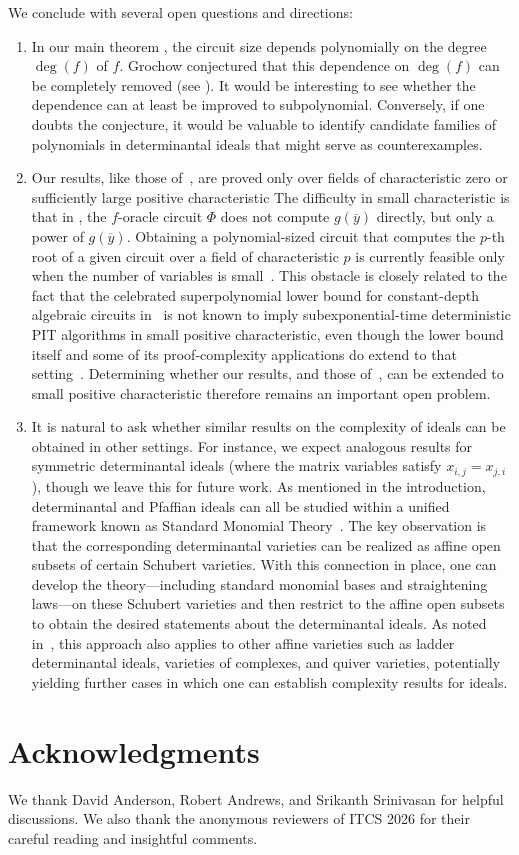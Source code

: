 \documentclass[10pt,a4paper]{amsart}
\begin{document}
We conclude with several open questions and directions:

\begin{enumerate}
\item In our main theorem , the circuit size depends polynomially on the degree $\deg(f)$ of $f$.
Grochow conjectured that this dependence on $\deg(f)$ can be completely removed (see ).
It would be interesting to see whether the dependence can at least be improved to subpolynomial.
Conversely, if one doubts the conjecture, it would be valuable to identify candidate families of polynomials in determinantal ideals that might serve as counterexamples.

\item Our results, like those of~\cite{AF21}, are proved only over fields of characteristic zero or sufficiently large positive characteristic 
The difficulty in small characteristic is that in , the $f$-oracle circuit $\Phi$ does not compute $g(\overline{y})$ directly, but only a power of $g(\overline{y})$.
Obtaining a polynomial-sized circuit that computes the $p$-th root of a given circuit over a field of characteristic $p$ is currently feasible only when the number of variables is small~\cite{And20}.
This obstacle is closely related to the fact that the celebrated superpolynomial lower bound for constant-depth algebraic circuits in~\cite{LST25} is not known to imply subexponential-time deterministic PIT algorithms in small positive characteristic, even though the lower bound itself and some of its proof-complexity applications do extend to that setting~\cite{For24,BLRS25}.
Determining whether our results, and those of~\cite{AF21}, can be extended to small positive characteristic therefore remains an important open problem.

\item It is natural to ask whether similar results on the complexity of ideals can be obtained in other settings.
For instance, we expect analogous results for symmetric determinantal ideals (where the matrix variables satisfy $x_{i,j} = x_{j,i}$), though we leave this for future work.
As mentioned in the introduction, determinantal and Pfaffian ideals can all be studied within a unified framework known as Standard Monomial Theory~\cite{LR08,Ses16}.
The key observation is that the corresponding determinantal varieties can be realized as affine open subsets of certain Schubert varieties.
With this connection in place, one can develop the theory---including standard monomial bases and straightening laws---on these Schubert varieties and then restrict to the affine open subsets to obtain the desired statements about the determinantal ideals.
As noted in~\cite{Mus03}, this approach also applies to other affine varieties such as ladder determinantal ideals, varieties of complexes, and quiver varieties, potentially yielding further cases in which one can establish complexity results for ideals.
\end{enumerate}

\section*{Acknowledgments}

We thank David Anderson, Robert Andrews, and Srikanth Srinivasan for helpful discussions. 
We also thank the anonymous reviewers of ITCS 2026 for their careful reading and insightful comments.




\end{document}
